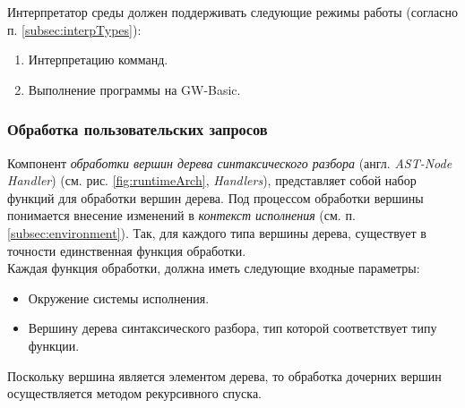\documentclass[12pt]{article}
\begin{document}
			\indent Интерпретатор среды должен поддерживать следующие режимы работы (согласно п. \ref{subsec:interpTypes}):
			\begin{enumerate}
				\item Интерпретацию комманд.
				\item Выполнение программы на GW-Basic.
			\end{enumerate}
			\subsubsection{Обработка пользовательских запросов}
			\hspace{\parindent} Компонент {\it обработки вершин дерева синтаксического разбора} (англ. {\it AST-Node Handler}) (см. рис. \ref{fig:runtimeArch}, {\it Handlers}), представляет собой набор функций для обработки вершин дерева. Под процессом обработки вершины понимается внесение изменений в {\it контекст исполнения} (см. п. \ref{subsec:environment}). Так, для каждого типа вершины дерева, существует в точности единственная функция обработки. \\
			\indent Каждая функция обработки, должна иметь следующие входные параметры:
			\begin{itemize}
				\item Окружение системы исполнения.
				\item Вершину дерева синтаксического разбора, тип которой соответствует типу функции.
			\end{itemize}
			
			\indent Поскольку вершина является элементом дерева, то обработка дочерних вершин осуществляется методом рекурсивного спуска.
\end{document}
